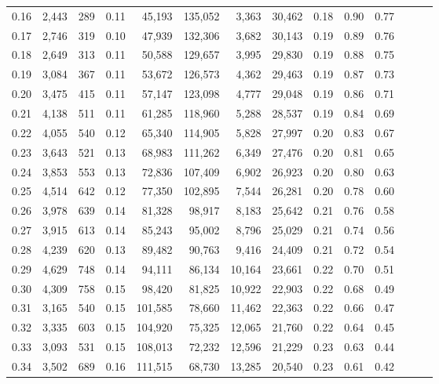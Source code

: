 \begin{tabular}{rrrrrrrrrrrrrr}
0.16 &  2,443 &  289 &  0.11 &   45,193 &  135,052 &   3,363 &  30,462 &  0.18 &  0.90 &      0.77 \\
0.17 &  2,746 &  319 &  0.10 &   47,939 &  132,306 &   3,682 &  30,143 &  0.19 &  0.89 &      0.76 \\
0.18 &  2,649 &  313 &  0.11 &   50,588 &  129,657 &   3,995 &  29,830 &  0.19 &  0.88 &      0.75 \\
0.19 &  3,084 &  367 &  0.11 &   53,672 &  126,573 &   4,362 &  29,463 &  0.19 &  0.87 &      0.73 \\
0.20 &  3,475 &  415 &  0.11 &   57,147 &  123,098 &   4,777 &  29,048 &  0.19 &  0.86 &      0.71 \\
0.21 &  4,138 &  511 &  0.11 &   61,285 &  118,960 &   5,288 &  28,537 &  0.19 &  0.84 &      0.69 \\
0.22 &  4,055 &  540 &  0.12 &   65,340 &  114,905 &   5,828 &  27,997 &  0.20 &  0.83 &      0.67 \\
0.23 &  3,643 &  521 &  0.13 &   68,983 &  111,262 &   6,349 &  27,476 &  0.20 &  0.81 &      0.65 \\
0.24 &  3,853 &  553 &  0.13 &   72,836 &  107,409 &   6,902 &  26,923 &  0.20 &  0.80 &      0.63 \\
0.25 &  4,514 &  642 &  0.12 &   77,350 &  102,895 &   7,544 &  26,281 &  0.20 &  0.78 &      0.60 \\
0.26 &  3,978 &  639 &  0.14 &   81,328 &   98,917 &   8,183 &  25,642 &  0.21 &  0.76 &      0.58 \\
0.27 &  3,915 &  613 &  0.14 &   85,243 &   95,002 &   8,796 &  25,029 &  0.21 &  0.74 &      0.56 \\
0.28 &  4,239 &  620 &  0.13 &   89,482 &   90,763 &   9,416 &  24,409 &  0.21 &  0.72 &      0.54 \\
0.29 &  4,629 &  748 &  0.14 &   94,111 &   86,134 &  10,164 &  23,661 &  0.22 &  0.70 &      0.51 \\
0.30 &  4,309 &  758 &  0.15 &   98,420 &   81,825 &  10,922 &  22,903 &  0.22 &  0.68 &      0.49 \\
0.31 &  3,165 &  540 &  0.15 &  101,585 &   78,660 &  11,462 &  22,363 &  0.22 &  0.66 &      0.47 \\
0.32 &  3,335 &  603 &  0.15 &  104,920 &   75,325 &  12,065 &  21,760 &  0.22 &  0.64 &      0.45 \\
0.33 &  3,093 &  531 &  0.15 &  108,013 &   72,232 &  12,596 &  21,229 &  0.23 &  0.63 &      0.44 \\
0.34 &  3,502 &  689 &  0.16 &  111,515 &   68,730 &  13,285 &  20,540 &  0.23 &  0.61 &      0.42 \\

\end{tabular}

